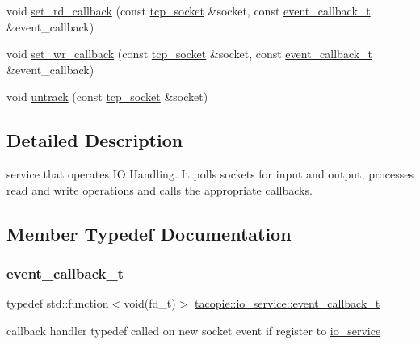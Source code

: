 \begin{DoxyCompactItemize}
\item 
void \hyperlink{classtacopie_1_1io__service_a8094c1fec76c6821cc0c008fe524c89a}{set\+\_\+rd\+\_\+callback} (const \hyperlink{classtacopie_1_1tcp__socket}{tcp\+\_\+socket} \&socket, const \hyperlink{classtacopie_1_1io__service_abb66850c32d9c724f4418d77bd04bcfd}{event\+\_\+callback\+\_\+t} \&event\+\_\+callback)
\item 
void \hyperlink{classtacopie_1_1io__service_a7c4f56c7790c7ba52b09837a42aaffb1}{set\+\_\+wr\+\_\+callback} (const \hyperlink{classtacopie_1_1tcp__socket}{tcp\+\_\+socket} \&socket, const \hyperlink{classtacopie_1_1io__service_abb66850c32d9c724f4418d77bd04bcfd}{event\+\_\+callback\+\_\+t} \&event\+\_\+callback)
\item 
void \hyperlink{classtacopie_1_1io__service_a9a7672f0894a0fc1a3e6c593ca6df22c}{untrack} (const \hyperlink{classtacopie_1_1tcp__socket}{tcp\+\_\+socket} \&socket)
\end{DoxyCompactItemize}


\subsection{Detailed Description}
service that operates IO Handling. It polls sockets for input and output, processes read and write operations and calls the appropriate callbacks. 

\subsection{Member Typedef Documentation}
\mbox{\label{classtacopie_1_1io__service_abb66850c32d9c724f4418d77bd04bcfd}} 
\subsubsection{\texorpdfstring{event\+\_\+callback\+\_\+t}{event\_callback\_t}}
{\footnotesize\ttfamily typedef std\+::function$<$void(fd\+\_\+t)$>$ \hyperlink{classtacopie_1_1io__service_abb66850c32d9c724f4418d77bd04bcfd}{tacopie\+::io\+\_\+service\+::event\+\_\+callback\+\_\+t}}

callback handler typedef called on new socket event if register to \hyperlink{classtacopie_1_1io__service}{io\+\_\+service} 

